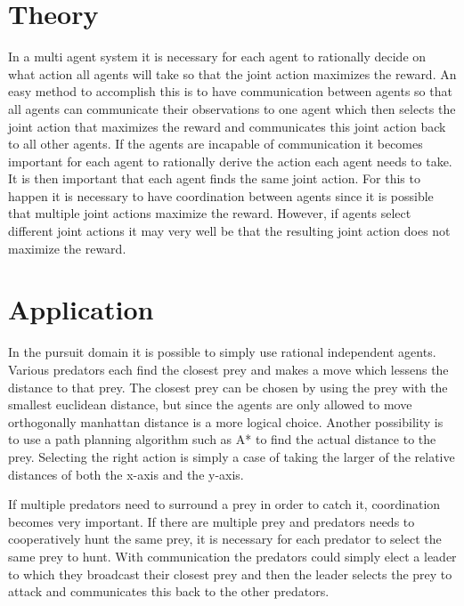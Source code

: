 \documentclass[10pt]{article}
\begin{document}
\section{Theory}\label{theory}
In a multi agent system it is necessary for each agent to rationally decide on what action all agents will take so that the joint action maximizes the reward. An easy method to accomplish this is to have communication between agents so that all agents can communicate their observations to one agent which then selects the joint action that maximizes the reward and communicates this joint action back to all other agents. If the agents are incapable of communication it becomes important for each agent to rationally derive the action each agent needs to take. It is then important that each agent finds the same joint action. For this to happen it is necessary to have coordination between agents\cite{Vlassis} since it is possible that multiple joint actions maximize the reward. However, if agents select different joint actions it may very well be that the resulting joint action does not maximize the reward.




\section{Application}\label{application}
In the pursuit domain it is possible to simply use rational independent agents. Various predators each find the closest prey and makes a move which lessens the distance to that prey. The closest prey can be chosen by using the prey with the smallest euclidean distance, but since the agents are only allowed to move orthogonally manhattan distance is a more logical choice. Another possibility is to use a path planning algorithm such as A* to find the actual distance to the prey. Selecting the right action is simply a case of taking the larger of the relative distances of both the x-axis and the y-axis.

If multiple predators need to surround a prey in order to catch it, coordination becomes very important. If there are multiple prey and predators needs to cooperatively hunt the same prey, it is necessary for each predator to select the same prey to hunt. With communication the predators could simply elect a leader to which they broadcast their closest prey and then the leader selects the prey to attack and communicates this back to the other predators.
\end{document}
